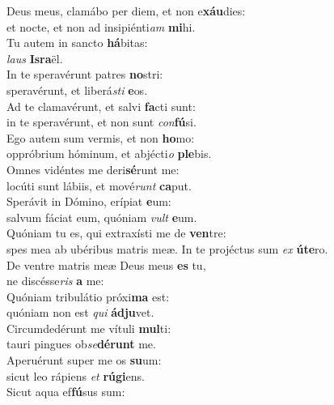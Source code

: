 \evenverse Deus meus, clamábo per diem, et non e\textbf{xáu}dies:~\*\\
\evenverse et nocte, et non ad insipiénti\textit{am} \textbf{mi}hi.\\
\oddverse Tu autem in sancto \textbf{há}bitas:~\*\\
\oddverse \textit{laus} \textbf{Is}\textbf{ra}ël.\\
\evenverse In te speravérunt patres \textbf{no}stri:~\*\\
\evenverse speravérunt, et liberá\textit{sti} \textbf{e}os.\\
\oddverse Ad te clamavérunt, et salvi \textbf{fa}cti sunt:~\*\\
\oddverse in te speravérunt, et non sunt \textit{con}\textbf{fú}si.\\
\evenverse Ego autem sum vermis, et non \textbf{ho}mo:~\*\\
\evenverse oppróbrium hóminum, et abjécti\textit{o} \textbf{ple}bis.\\
\oddverse Omnes vidéntes me deri\textbf{sé}runt me:~\*\\
\oddverse locúti sunt lábiis, et mové\textit{runt} \textbf{ca}put.\\
\evenverse Sperávit in Dómino, erípiat \textbf{e}um:~\*\\
\evenverse salvum fáciat eum, quóniam \textit{vult} \textbf{e}um.\\
\oddverse Quóniam tu es, qui extraxísti me de \textbf{ven}tre:~\*\\
\oddverse spes mea ab ubéribus matris meæ. In te projéctus sum \textit{ex} \textbf{ú}\textbf{te}ro.\\
\evenverse De ventre matris meæ Deus meus \textbf{es} tu,~\*\\
\evenverse ne discésse\textit{ris} \textbf{a} me:\\
\oddverse Quóniam tribulátio próxi\textbf{ma} est:~\*\\
\oddverse quóniam non est \textit{qui} \textbf{ád}\textbf{ju}vet.\\
\evenverse Circumdedérunt me vítuli \textbf{mul}ti:~\*\\
\evenverse tauri pingues ob\textit{se}\textbf{dé}\textbf{runt} me.\\
\oddverse Aperuérunt super me os \textbf{su}um:~\*\\
\oddverse sicut leo rápiens \textit{et} \textbf{rú}\textbf{gi}ens.\\
\evenverse Sicut aqua ef\textbf{fú}sus sum:~\*\\
